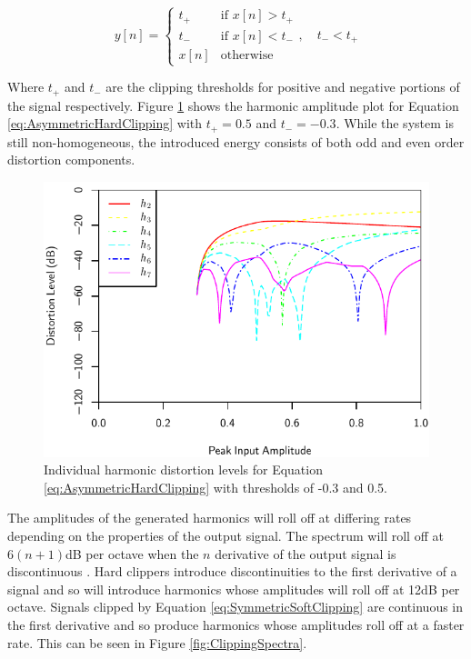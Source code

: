 			\begin{equation}
				y[n] = \begin{cases}
					t_{+} & \text{if $x[n] > t_{+}$} \\
					t_{-} & \text{if $x[n] < t_{-}$} \\
					x[n] & \text{otherwise}
				\end{cases}, \quad t_{-} < t_{+}
				\label{eq:AsymmetricHardClipping}
			\end{equation}

			Where $t_{+}$ and $t_{-}$ are the clipping thresholds for positive and negative portions of the
			signal respectively. Figure \ref{fig:AsymmetricHardClippingHarmonics} shows the harmonic amplitude
			plot for Equation \ref{eq:AsymmetricHardClipping} with $t_{+} = 0.5$ and $t_{-} = -0.3$. While the
			system is still non-homogeneous, the introduced energy consists of both odd and even order
			distortion components.

			\begin{figure}[h!]
				\centering
				\includegraphics{chapter5/Images/AsymmetricHardClippingHarmonics.pdf}
				\caption{Individual harmonic distortion levels for Equation
					 \ref{eq:AsymmetricHardClipping} with thresholds of -0.3 and 0.5.}
				\label{fig:AsymmetricHardClippingHarmonics}
			\end{figure}

			The amplitudes of the generated harmonics will roll off at differing rates depending on the
			properties of the output signal. The spectrum will roll off at $6(n+1)$dB per octave when the
			$n$ derivative of the output signal is discontinuous \citep{kraght2000aliasing}.  Hard
			clippers introduce discontinuities to the first derivative of a signal and so will introduce
			harmonics whose amplitudes will roll off at 12dB per octave. Signals clipped by Equation
			\ref{eq:SymmetricSoftClipping} are continuous in the first derivative and so produce harmonics
			whose amplitudes roll off at a faster rate. This can be seen in Figure \ref{fig:ClippingSpectra}.

